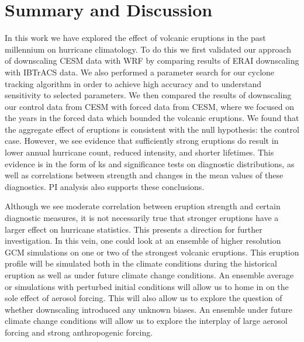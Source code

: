 \documentclass[smallextended]{svjour3}       %
\begin{document}
\section{Summary and Discussion}
\label{discuss}
In this work we have explored the effect of volcanic eruptions in the past millennium on hurricane climatology. To do this we first validated our approach of downscaling CESM data with WRF by comparing results of ERAI downscaling with IBTrACS data. We also performed a parameter search for our cyclone tracking algorithm in order to achieve high accuracy and to understand sensitivity to selected parameters. We then compared the results of downscaling our control data from CESM with forced data from CESM, where we focused on the years in the forced data which bounded the volcanic eruptions. We found that the aggregate effect of eruptions is consistent with the null hypothesis: the control case. However, we see evidence that sufficiently strong eruptions do result in lower annual hurricane count, reduced intensity, and shorter lifetimes. This evidence is in the form of ks and significance tests on diagnostic distributions, as well as correlations between strength and changes in the mean values of these diagnostics. PI analysis also supports these conclusions. 
\par
Although we see moderate correlation between eruption strength and certain diagnostic measures, it is not necessarily true that stronger eruptions have a larger effect on hurricane statistics. This presents a direction for further investigation. In this vein, one could look at an ensemble of higher resolution GCM simulations on one or two of the strongest volcanic eruptions. This eruption profile will be simulated both in the climate conditions during the historical eruption as well as under future climate change conditions. An ensemble average or simulations with perturbed initial conditions will allow us to home in on the sole effect of aerosol forcing. This will also allow us to explore the question of whether downscaling introduced any unknown biases. An ensemble under future climate change conditions will allow us to explore the interplay of large aerosol forcing and strong anthropogenic forcing.    



 
\end{document}
